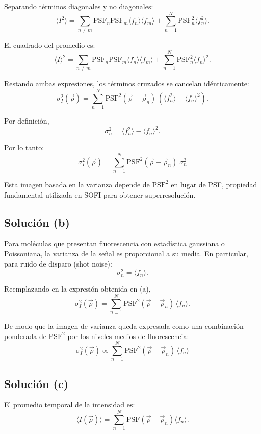 \documentclass[11pt]{article}
\begin{document}
Separando términos diagonales y no diagonales:
\[
\langle I^2 \rangle
= \sum_{n\neq m}
\text{PSF}_n \text{PSF}_m 
\langle f_n \rangle \langle f_m \rangle
+ \sum_{n=1}^{N} \text{PSF}_n^2 \langle f_n^2 \rangle.
\]

El cuadrado del promedio es:
\[
\langle I \rangle^2
= \sum_{n\neq m}
\text{PSF}_n \text{PSF}_m 
\langle f_n \rangle \langle f_m \rangle
+ \sum_{n=1}^{N}
\text{PSF}_n^2 \langle f_n \rangle^2.
\]

Restando ambas expresiones, los términos cruzados se cancelan idénticamente:
\[
\sigma_I^2(\vec{\rho})
= \sum_{n=1}^{N}
\text{PSF}^2(\vec{\rho}-\vec{\rho}_n)\,
\left( \langle f_n^2 \rangle - \langle f_n \rangle^2 \right).
\]

Por definición,
\[
\sigma_n^2 = 
\langle f_n^2 \rangle - \langle f_n \rangle^2.
\]

Por lo tanto:
\[
\sigma_I^2(\vec{\rho})
= \sum_{n=1}^{N}
\text{PSF}^2(\vec{\rho}-\vec{\rho}_n)\;
\sigma_n^2
\]

Esta imagen basada en la varianza depende de $\text{PSF}^2$ en lugar de PSF, propiedad fundamental utilizada en SOFI para obtener superresolución.


\subsection*{Solución (b)}

Para moléculas que presentan fluorescencia con estadística gaussiana o Poissoniana, la varianza de la señal es proporcional a su media. En particular, para ruido de disparo (shot noise):
\[
\sigma_n^2 = \langle f_n \rangle.
\]

Reemplazando en la expresión obtenida en (a),
\[
\sigma_I^2(\vec{\rho})
= \sum_{n=1}^{N}
\text{PSF}^2(\vec{\rho} - \vec{\rho}_n)\,
\langle f_n \rangle.
\]

De modo que la imagen de varianza queda expresada como una combinación ponderada de $\text{PSF}^2$ por los niveles medios de fluorescencia:
\[
\sigma_I^2(\vec{\rho})
\propto
\sum_{n=1}^{N}
\text{PSF}^2(\vec{\rho} - \vec{\rho}_n)
\, \langle f_n \rangle
\]


\subsection*{Solución (c)}

El promedio temporal de la intensidad es:
\[
\langle I(\vec{\rho}) \rangle
= \sum_{n=1}^{N}
\text{PSF}(\vec{\rho} - \vec{\rho}_n)
\langle f_n \rangle.
\]
\end{document}
